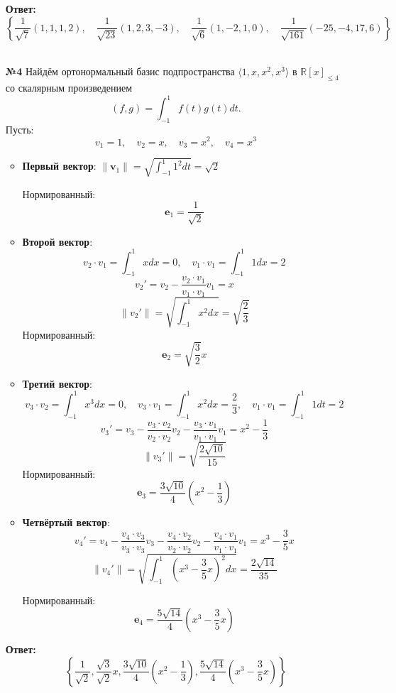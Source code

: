 \documentclass[a4paper]{article}
\renewcommand{\f}[2]{\frac{#1}{#2}}
\begin{document}
\begin{enumerate}
    \textbf{Ответ:}$$ \left\{
        \frac{1}{\sqrt{7}}(1, 1, 1, 2), \quad
        \frac{1}{\sqrt{23}}(1, 2, 3, -3), \quad
        \frac{1}{\sqrt{6}}(1, -2, 1, 0), \quad
        \frac{1}{\sqrt{161}}(-25, -4, 17, 6)
        \right\}$$\\
    
    \item[\textbf{№4}]Найдём ортонормальный базис подпространства \(\langle 1, x, x^2, x^3 \rangle\) в \(\mathbb{R}[x]_{\leqslant 4}\) со скалярным произведением
    \[ (f, g) = \int_{-1}^{1} f(t)g(t)dt. \]
    Пусть:
    $$v_1 = 1, \quad v_2 = x, \quad v_3 = x^2, \quad v_4 = x^3$$
    \begin{itemize}
        \item \textbf{Первый вектор}:  
        \(\|\mathbf{v}_1\| = \sqrt{\int_{-1}^{1} 1^2 dt} = \sqrt{2}\)

        Нормированный:
        \[
        \mathbf{e}_1 = \f{1}{\sqrt{2}}
        \]
        \item \textbf{Второй вектор}: 
        $$v_2 \cdot v_1 = \int_{-1}^{1} x dx = 0, \quad v_1 \cdot v_1 = \int_{-1}^{1} 1 dx = 2$$
        \[
        v_2' = v_2 - \f{v_2 \cdot v_1}{v_1 \cdot v_1}v_1 =  x
        \]
        \[\|v_2'\| = \sqrt{\int_{-1}^{1} x^2 dx} = \sqrt{\f{2}{3}}\]
        Нормированный:
        \[\mathbf{e}_2 = \sqrt{\f{3}{2}}x\]

        \item \textbf{Третий вектор}: 
        $$v_3 \cdot v_2 = \int_{-1}^{1} x^3dx = 0, \quad v_3
         \cdot v_1 = \int_{-1}^{1} x^2dx = \f{2}{3}, \quad v_1 \cdot v_1 = \int_{-1}^{1} 1dt = 2$$
        $$v_3' = v_3 - \f{v_3 \cdot v_2}{v_2 \cdot v_2} v_2 - \f{v_3 \cdot v_1}{v_1\cdot v_1}v_1 = x^2 -\f{1}{3}$$
        $$\|v_3'\| = \sqrt{\f{2\sqrt{10}}{15}}$$
        Нормированный:
        \[\mathbf{e}_3 =\f{3\sqrt{10}}{4}(x^2-\f{1}{3})\]

        \item \textbf{Четвёртый вектор}:
        $$v_4' = v_4 - \f{v_4 \cdot v_3}{v_3 \cdot v_3}v_3 - 
        \f{v_4 \cdot v_2}{v_2 \cdot v_2}v_2 - \f{v_4 \cdot v_1}{v_1 \cdot v_1}v_1 = x^3 - \frac{3}{5}x$$
        $$\|v_4'\| = \sqrt{\int_{-1}^1 \left(x^3 - \frac{3}{5}x\right)^2 dx} = \frac{2\sqrt{14}}{35}$$

        Нормированный:
        \[\mathbf{e}_4 =\frac{5\sqrt{14}}{4} \left(x^3 - \frac{3}{5}x\right)\]
    \end{itemize}
    \textbf{Ответ:}
    $$\left\{
        \frac{1}{\sqrt{2}},
        \frac{\sqrt{3}}{\sqrt{2}} x,
        \frac{3\sqrt{10}}{4} \left(x^2 - \frac{1}{3}\right),
        \frac{5\sqrt{14}}{4} \left(x^3 - \frac{3}{5}x\right)
        \right\}$$\\
    

\end{enumerate}
\end{document}
